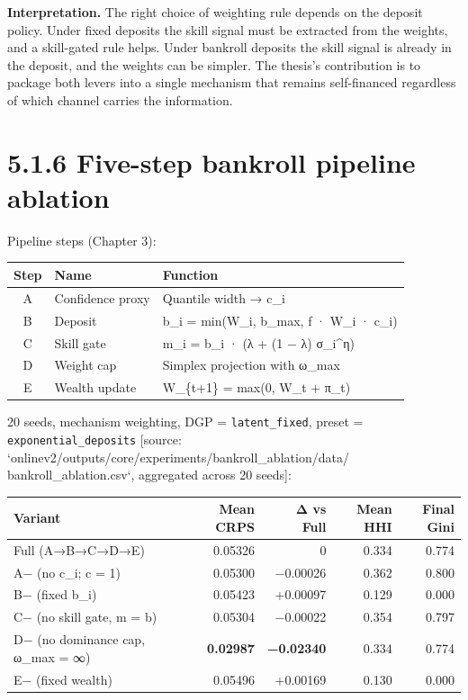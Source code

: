\documentclass[11pt,a4paper,openany]{report}
\begin{document}
\textbf{Interpretation.} The right choice of weighting rule depends on the
deposit policy. Under fixed deposits the skill signal must be
extracted from the weights, and a skill-gated rule helps. Under
bankroll deposits the skill signal is already in the deposit, and
the weights can be simpler. The thesis's contribution is to package
both levers into a single mechanism that remains self-financed
regardless of which channel carries the information.

\section{5.1.6 Five-step bankroll pipeline ablation}

Pipeline steps (Chapter 3):

\begin{center}
\small
\begin{tabular}{cll}
\toprule
\textbf{Step} & \textbf{Name} & \textbf{Function} \\
\midrule
A & Confidence proxy & Quantile width → c\_i \\
B & Deposit & b\_i = min(W\_i, b\_max, f · W\_i · c\_i) \\
C & Skill gate & m\_i = b\_i · (λ + (1 − λ) σ\_i\textasciicircum{}η) \\
D & Weight cap & Simplex projection with ω\_max \\
E & Wealth update & W\_\{t+1\} = max(0, W\_t + π\_t) \\
\bottomrule
\end{tabular}
\end{center}

20 seeds, mechanism weighting, DGP = \texttt{latent\_fixed}, preset =
\texttt{exponential\_deposits}
[source: `onlinev2/outputs/core/experiments/bankroll\_ablation/data/
bankroll\_ablation.csv`, aggregated across 20 seeds]:

\begin{center}
\small
\begin{tabular}{lrrrr}
\toprule
\textbf{Variant} & \textbf{Mean CRPS} & \textbf{Δ vs Full} & \textbf{Mean HHI} & \textbf{Final Gini} \\
\midrule
Full (A→B→C→D→E) & 0.05326 & 0 & 0.334 & 0.774 \\
A− (no c\_i; c = 1) & 0.05300 & −0.00026 & 0.362 & 0.800 \\
B− (fixed b\_i) & 0.05423 & +0.00097 & 0.129 & 0.000 \\
C− (no skill gate, m = b) & 0.05304 & −0.00022 & 0.354 & 0.797 \\
D− (no dominance cap, ω\_max = ∞) & \textbf{0.02987} & \textbf{−0.02340} & 0.334 & 0.774 \\
E− (fixed wealth) & 0.05496 & +0.00169 & 0.130 & 0.000 \\
\bottomrule
\end{tabular}
\end{center}
\end{document}
